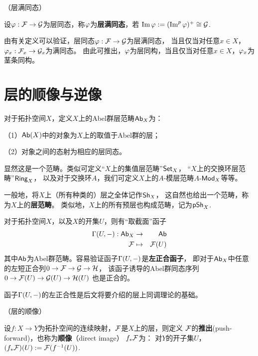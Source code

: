 \begin{definition}（层满同态）

设$\varphi:\mathcal{F}\to\mathcal{G}$为层同态，称$\varphi$为\textbf{层满同态}，若
$\operatorname{Im}\varphi:=(\operatorname{Im}^p\varphi)^+\cong\mathcal{G}$.
\end{definition}

由有关定义可以验证，层同态$\varphi:\mathcal{F}\to\mathcal{G}$为层满同态，
当且仅当对任意$x\in X$，$\varphi_x:\mathcal{F}_x\to\mathcal{G}_x$为满同态。
由此可推出，$\varphi$为层同构，当且仅当对任意$x\in X$，$\varphi_x$为茎条同构。

\section{层的顺像与逆像}

\begin{notation}对于拓扑空间$X$，定义$X$上的Abel群层范畴$\operatorname{\mathsf{Ab}}_X$为：

（1）$\operatorname{\mathsf{Ab}}(X)$中的对象为$X$上的取值于Abel群的层；

（2）对象之间的态射为相应的层同态。
\end{notation}
显然这是一个范畴。类似可定义“$X$上的集值层范畴”$\operatorname{\mathsf{Set}}_X$，
“$X$上的交换环层范畴”$\operatorname{\mathsf{Ring}}_X$，
以及对于交换环$A$，我们可定义$X$上的$A$-模层范畴$A\operatorname{\!\text{-}\mathsf{Mod}}_X$等等。

一般地，将$X$上（所有种类的）层之全体记作$\operatorname{\mathsf{Sh}}_X$，
这自然也给出一个范畴，称为$X$上的\textbf{层范畴}。
类似地，$X$上的所有预层也构成范畴，记为$\operatorname{\mathsf{pSh}}_X$.

\begin{rem}对于拓扑空间$X$，以及$X$的开集$U$，则有“取截面”函子
\begin{eqnarray*}
  \Gamma(U,-):\operatorname{\mathsf{Ab}}_X&\to&\operatorname{\mathsf{Ab}}\\
            \mathcal{F}&\mapsto&\mathcal{F}(U)
\end{eqnarray*}
其中$\operatorname{\mathsf{Ab}}$为Abel群范畴。容易验证函子$\Gamma(U,-)$是\textbf{左正合函子}，
即对于$\operatorname{\mathsf{Ab}}_X$中任意的左短正合列$0\to\mathcal{F}\to\mathcal{G}\to\mathcal{H}$，
该函子诱导的Abel群同态序列
$0\to\mathcal{F}(U)\to\mathcal{G}(U)\to\mathcal{H}(U)$
也是正合的。\label{取截面函子左正合-rem}
\end{rem}

函子$\Gamma(U,-)$的左正合性是后文将要介绍的层上同调理论的基础。

\begin{definition}（层的顺像）

设$f:X\to Y$为拓扑空间的连续映射，$\mathcal{F}$是$X$上的层，则定义
$\mathcal{F}$的\textbf{推出}(push-forward)，也称为\textbf{顺像}（direct image）
$f_*\mathcal{F}$为：
对$Y$的开子集$U$，$(f_*\mathcal{F})(U):=\mathcal{F}(f^{-1}(U))$.
\end{definition}

